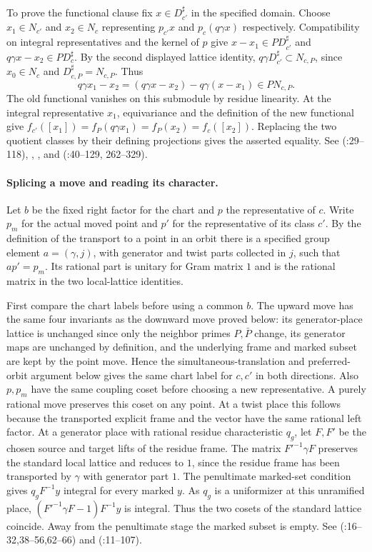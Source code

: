 To prove the functional clause fix $x\in D_{c'}^\sharp$ in the
specified domain. Choose $x_1\in N_{c'}$ and $x_2\in N_c$ representing
$p_{c'}x$ and $p_c(q\gamma x)$ respectively. Compatibility on integral
representatives and the kernel of $p$ give
$x-x_1\in P D_{c'}^\sharp$ and $q\gamma x-x_2\in P D_c^\sharp$.
By the second displayed lattice identity,
$q\gamma D_{c'}^\sharp\subset N_{c,P}$, since $x_0\in N_c$ and
$D_{c,P}^\sharp=N_{c,P}$. Thus
\[
 q\gamma x_1-x_2=(q\gamma x-x_2)-q\gamma(x-x_1)\in P N_{c,P}.
\]
The old functional vanishes on this submodule by residue linearity.
At the integral representative $x_1$, equivariance and the definition
of the new functional give
$f_{c'}([x_1])=f_{P}(q\gamma x_1)=f_P(x_2)=f_c([x_2])$.
Replacing the two quotient classes by their defining projections gives
the asserted equality. See 
(:29--118),
, ,  and 
(:40--129, 262--329).

\paragraph{Splicing a move and reading its character.}
Let $b$ be the fixed right factor for the chart and $p$ the
representative of $c$. Write $p_m$ for the actual moved point and
$p'$ for the representative of its class $c'$. By the definition of
the transport to a point in an orbit there is a specified group
element $a=(\gamma,j)$, with generator and twist parts collected in $j$,
such that $a p'=p_m$. Its rational part is unitary for Gram matrix $1$
and is the rational matrix in the two local-lattice identities.

First compare the chart labels before using a common $b$. The upward
move has the same four invariants as the downward move proved below:
its generator-place lattice is unchanged since only the neighbor
primes $P,\bar P$ change, its generator maps are unchanged by
definition, and the underlying frame and marked subset are kept by the
point move. Hence the simultaneous-translation and preferred-orbit
argument below gives the same chart label for $c,c'$ in both directions.
Also $p,p_m$ have the same coupling coset before choosing a new
representative. A purely rational move preserves this coset on any
point. At a twist place this follows because the transported explicit
frame and the vector have the same rational left factor. At a generator
place with rational residue characteristic $q_g$, let $F,F'$ be the
chosen source and target lifts of the residue frame. The matrix
$F'^{-1}\gamma F$ preserves the standard local lattice and reduces
to $1$, since the residue frame has been transported by $\gamma$
with generator part $1$. The penultimate marked-set condition gives
$q_g F^{-1}y$ integral for every marked $y$. As $q_g$ is a uniformizer
at this unramified place, $(F'^{-1}\gamma F-1)F^{-1}y$ is integral.
Thus the two cosets of the standard lattice coincide. Away from the
penultimate stage the marked subset is empty. See 
(:16--32,38--56,62--66) and 
(:11--107).

